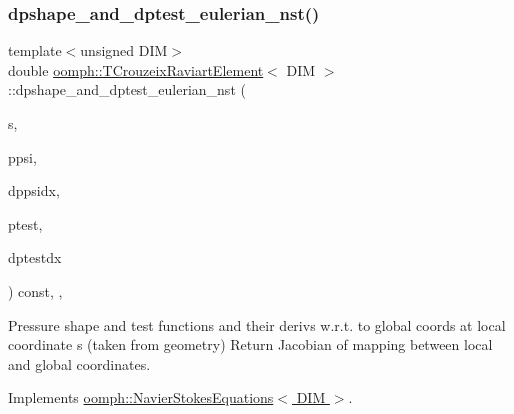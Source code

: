 \subsubsection{\texorpdfstring{dpshape\+\_\+and\+\_\+dptest\+\_\+eulerian\+\_\+nst()}{dpshape\_and\_dptest\_eulerian\_nst()}\hspace{0.1cm}{\footnotesize\ttfamily [1/3]}}
{\footnotesize\ttfamily template$<$unsigned D\+IM$>$ \\
double \hyperlink{classoomph_1_1TCrouzeixRaviartElement}{oomph\+::\+T\+Crouzeix\+Raviart\+Element}$<$ D\+IM $>$\+::dpshape\+\_\+and\+\_\+dptest\+\_\+eulerian\+\_\+nst (\begin{DoxyParamCaption}\item[{const \hyperlink{classoomph_1_1Vector}{Vector}$<$ double $>$ \&}]{s,  }\item[{\hyperlink{classoomph_1_1Shape}{Shape} \&}]{ppsi,  }\item[{\hyperlink{classoomph_1_1DShape}{D\+Shape} \&}]{dppsidx,  }\item[{\hyperlink{classoomph_1_1Shape}{Shape} \&}]{ptest,  }\item[{\hyperlink{classoomph_1_1DShape}{D\+Shape} \&}]{dptestdx }\end{DoxyParamCaption}) const\hspace{0.3cm}{\ttfamily [inline]}, {\ttfamily [protected]}, {\ttfamily [virtual]}}



Pressure shape and test functions and their derivs w.\+r.\+t. to global coords at local coordinate s (taken from geometry) Return Jacobian of mapping between local and global coordinates. 



Implements \hyperlink{classoomph_1_1NavierStokesEquations_a2f3024a4d370ec45ddffacb236bc2bb2}{oomph\+::\+Navier\+Stokes\+Equations$<$ D\+I\+M $>$}.

\mbox{\label{classoomph_1_1TCrouzeixRaviartElement_a399c7fe8c79d8954edd98823a776e7b7}} 
